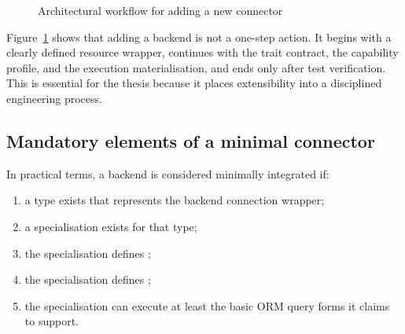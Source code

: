 \begin{figure}[H]
\centering
{}
\caption{Architectural workflow for adding a new connector}
\label{fig:connector_workflow}
\end{figure}

Figure~\ref{fig:connector_workflow} shows that adding a backend is not a one-step action. It begins with a clearly defined resource wrapper, continues with the trait contract, the capability profile, and the execution materialisation, and ends only after test verification. This is essential for the thesis because it places extensibility into a disciplined engineering process.

\subsection{Mandatory elements of a minimal connector}

In practical terms, a backend is considered minimally integrated if:

\begin{enumerate}[label=\arabic*.]
    \item a type exists that represents the backend connection wrapper;
    \item a  specialisation exists for that type;
    \item the specialisation defines ;
    \item the specialisation defines ;
    \item the specialisation can execute at least the basic ORM query forms it claims to support.
\end{enumerate}

